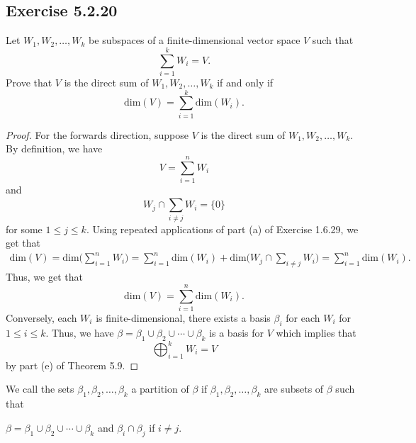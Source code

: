 \subsection*{Exercise 5.2.20} Let \( {W}_{1}, {W}_{2}, \dots, {W}_{k} \) be subspaces of a finite-dimensional vector space \( V  \) such that 
\[  \sum_{ i=1 }^{ k  } {W}_{i} = V. \]
Prove that \( V  \) is the direct sum of \( {W}_{1}, {W}_{2}, \dots, {W}_{k} \) if and only if 
\[  \text{dim}(V) = \sum_{ i=1 }^{ k } \text{dim}({W}_{i}). \]
\begin{proof}
For the forwards direction, suppose \( V \) is the direct sum of \( {W}_{1}, {W}_{2}, \dots, {W}_{k} \). By definition, we have 
\[  V = \sum_{ i=1  }^{ n  } {W}_{i} \]
and 
\[ {W}_{j} \cap \sum_{ i \neq j  }^{  } {W}_{i} = \{ 0 \}   \] 
for some \( 1 \leq j \leq k   \).
Using repeated applications of part (a) of Exercise 1.6.29, we get that 
\begin{align*}
    \text{dim}(V) = \text{dim} \Big(  \sum_{ i=1  }^{ n } {W}_{i} \Big)  
                  = \sum_{ i=1  }^{ n } \text{dim}({W}_{i}) + \text{dim}\Big(  {W}_{j} \cap \sum_{ i \neq j }^{  } {W}_{i} \Big) 
                  = \sum_{ i=1  }^{ n } \text{dim}({W}_{i}).
\end{align*}
Thus, we get that
\[  \text{dim}(V) = \sum_{ i=1  }^{ n } \text{dim}({W}_{i}). \]
Conversely, each \( {W}_{i} \) is finite-dimensional, there exists a basis \( {\beta}_{i}  \) for each \( {W}_{i} \) for \( 1 \leq i \leq k  \). Thus, we have \( \beta = {\beta}_{1} \cup {\beta}_{2} \cup \cdots \cup {\beta}_{k} \) is a basis for \( V  \) which implies that
\[  \bigoplus_{i=1}^{k} {W}_{i} = V  \]
by part (e) of Theorem 5.9.
\end{proof} 

\begin{definition}[Partitions]
    We call the sets \( {\beta}_{1}, {\beta}_{2}, \dots, {\beta}_{k} \) a partition of \( \beta \) if \(   {\beta}_{1}, {\beta}_{2}, \dots, {\beta}_{k} \) are subsets of \( \beta \) such that
    \begin{center}
        \( \beta = {\beta}_{1} \cup {\beta}_{2} \cup \cdots \cup {\beta}_{k} \) and \( {\beta}_{i} \cap {\beta}_{j}  \) if \( i \neq j  \).
    \end{center}
\end{definition}

